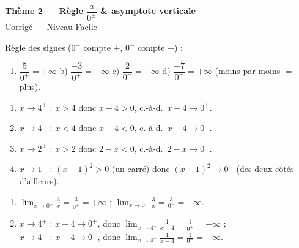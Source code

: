 \documentclass[11pt,a4paper]{article}
\begin{document}
\begin{center}
{\Large\bfseries\color{primarydark}Thème 2 — Règle $\dfrac{a}{0^{\pm}}$ \& asymptote verticale}\\[2pt]
{\large\color{excol}Corrigé — Niveau Facile}
\end{center}
\vspace{6pt}

\begin{correction}
Règle des signes ($0^{+}$ compte $+$, $0^{-}$ compte $-$) :
\begin{enumerate}[label=\alph*),leftmargin=2em,itemsep=3pt]
  \item $\dfrac{5}{0^{+}}=+\infty$ \quad b) $\dfrac{-3}{0^{+}}=-\infty$ \quad
        c) $\dfrac{2}{0^{-}}=-\infty$ \quad d) $\dfrac{-7}{0^{-}}=+\infty$ (moins par moins $=$ plus).
\end{enumerate}
\end{correction}

\begin{correction}
\begin{enumerate}[label=\alph*),leftmargin=2em,itemsep=3pt]
  \item $x\to 4^{+}$ : $x>4$ donc $x-4>0$, c.-à-d.\ $x-4\to 0^{+}$.
  \item $x\to 4^{-}$ : $x<4$ donc $x-4<0$, c.-à-d.\ $x-4\to 0^{-}$.
  \item $x\to 2^{+}$ : $x>2$ donc $2-x<0$, c.-à-d.\ $2-x\to 0^{-}$.
  \item $x\to 1^{-}$ : $(x-1)^2>0$ (un carré) donc $(x-1)^2\to 0^{+}$ (des deux côtés d'ailleurs).
\end{enumerate}
\end{correction}

\begin{correction}
\begin{enumerate}[label=\alph*),leftmargin=2em,itemsep=3pt]
  \item $\displaystyle\lim_{x\to 0^{+}}\frac{3}{x}=\frac{3}{0^{+}}=+\infty$ ; \quad
        $\displaystyle\lim_{x\to 0^{-}}\frac{3}{x}=\frac{3}{0^{-}}=-\infty$.
  \item $x\to 4^{+}$ : $x-4\to 0^{+}$, donc $\displaystyle\lim_{x\to 4^{+}}\frac{1}{x-4}=\frac{1}{0^{+}}=+\infty$ ;\\
        $x\to 4^{-}$ : $x-4\to 0^{-}$, donc $\displaystyle\lim_{x\to 4^{-}}\frac{1}{x-4}=\frac{1}{0^{-}}=-\infty$.
\end{enumerate}
\end{correction}
\end{document}
